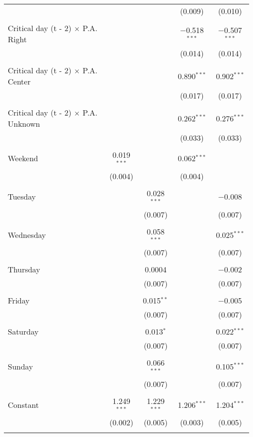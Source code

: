 \documentclass[
]{article}
\begin{document}
\begin{table}[!htbp]
{\begin{tabular}{@{\extracolsep{5pt}}lcccc}
  &  &  & (0.009) & (0.010) \\ 
  & & & & \\ 
 Critical day (t - 2) $\times$ P.A. Right &  &  & $-$0.518$^{***}$ & $-$0.507$^{***}$ \\ 
  &  &  & (0.014) & (0.014) \\ 
  & & & & \\ 
 Critical day (t - 2) $\times$ P.A. Center &  &  & 0.890$^{***}$ & 0.902$^{***}$ \\ 
  &  &  & (0.017) & (0.017) \\ 
  & & & & \\ 
 Critical day (t - 2) $\times$ P.A. Unknown &  &  & 0.262$^{***}$ & 0.276$^{***}$ \\ 
  &  &  & (0.033) & (0.033) \\ 
  & & & & \\ 
 Weekend & 0.019$^{***}$ &  & 0.062$^{***}$ &  \\ 
  & (0.004) &  & (0.004) &  \\ 
  & & & & \\ 
 Tuesday &  & 0.028$^{***}$ &  & $-$0.008 \\ 
  &  & (0.007) &  & (0.007) \\ 
  & & & & \\ 
 Wednesday &  & 0.058$^{***}$ &  & 0.025$^{***}$ \\ 
  &  & (0.007) &  & (0.007) \\ 
  & & & & \\ 
 Thursday &  & 0.0004 &  & $-$0.002 \\ 
  &  & (0.007) &  & (0.007) \\ 
  & & & & \\ 
 Friday &  & 0.015$^{**}$ &  & $-$0.005 \\ 
  &  & (0.007) &  & (0.007) \\ 
  & & & & \\ 
 Saturday &  & 0.013$^{*}$ &  & 0.022$^{***}$ \\ 
  &  & (0.007) &  & (0.007) \\ 
  & & & & \\ 
 Sunday &  & 0.066$^{***}$ &  & 0.105$^{***}$ \\ 
  &  & (0.007) &  & (0.007) \\ 
  & & & & \\ 
 Constant & 1.249$^{***}$ & 1.229$^{***}$ & 1.206$^{***}$ & 1.204$^{***}$ \\ 
  & (0.002) & (0.005) & (0.003) & (0.005) \\ 
  & & & & \\ 

\end{tabular}}
\end{table}
\end{document}
